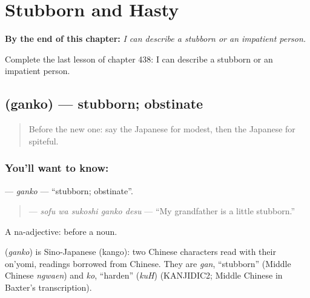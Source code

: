 
\chapter{Stubborn and Hasty}
\label{ch:ja-stubborn-and-hasty}

\begin{chapteropening}
\textbf{By the end of this chapter:} \emph{I can describe a stubborn or an impatient person.}

Complete the last lesson of chapter 438: I can describe a stubborn or an impatient person.
\end{chapteropening}

\section[\texorpdfstring{\ja{がんこ} (ganko)}{がんこ (ganko)}]{ (ganko) — stubborn; obstinate}

\label{lesson:JA-C438-ganko}



\begin{quote}
Before the new one: say the Japanese for modest, then the Japanese for spiteful.
\end{quote}

\subsection*{You'll want to know: }
\textbf{} — \emph{ganko} — \textquotedblleft{}stubborn; obstinate\textquotedblright{}.

\begin{quote}
\textbf{  } — \emph{sofu wa sukoshi ganko desu} — \textquotedblleft{}My grandfather is a little stubborn.\textquotedblright{}
\end{quote}

A na-adjective:  before a noun.

\begin{cousinweb}
\textbf{} (\emph{ganko}) is Sino-Japanese (kango): two Chinese characters read with their on'yomi, readings borrowed from Chinese. They are \emph{gan}, \textquotedblleft{}stubborn\textquotedblright{} (Middle Chinese \emph{ngwaen}) and \emph{ko}, \textquotedblleft{}harden\textquotedblright{} (\emph{kuH}) (KANJIDIC2; Middle Chinese in Baxter's transcription).
\end{cousinweb}

